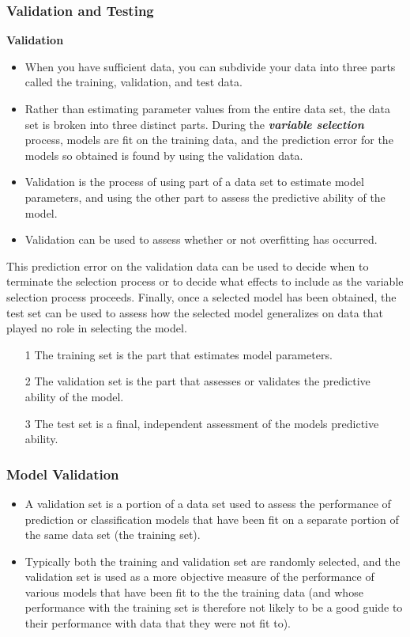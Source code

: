 \documentclass[PredictiveAnalytics101.tex]{subfiles}
\begin{document}
	\begin{frame}
		\frametitle{Validation and Testing}
		\textbf{Validation}
		\begin{itemize}
			\item When you have sufficient data, you can subdivide your data into three parts called the training, validation, and test data. \item Rather than estimating parameter values from the entire data set, the data set is broken into three distinct parts. During the \textbf{\textit{variable selection}} process, models are fit on the training data, and the prediction error for the models so obtained is found by using the validation data. \item Validation is the process of using part of a data set to estimate model parameters, and using the other part to assess the predictive ability of the model. 
			\item Validation can be used to assess whether or not overfitting has occurred.
		\end{itemize}
	\end{frame}
	\begin{frame}
		This prediction error on the validation data can be used to decide when to terminate the selection process or to decide what effects to include as the variable selection process proceeds. Finally, once a selected model has been obtained, the test set can be used to assess how the selected model generalizes on data that played no role in selecting the model.
		
		\begin{itemize}
			\item[1] The training set is the part that estimates model parameters.
			\item[2] The validation set is the part that assesses or validates the predictive ability of the model.
			\item[3] The test set is a final, independent assessment of the models predictive ability.
		\end{itemize}
	\end{frame}
	\begin{frame}
		\frametitle{Model Validation}
		\Large
		\begin{itemize}
			\item A validation set is a portion of a data set used to assess the performance of prediction or classification models that have been fit on a separate portion of the same data set (the training set). 
			\item Typically both the training and validation set are randomly selected, and the validation set is used as a more objective measure of the performance of various models that have been fit to the the training data (and whose performance with the training set is therefore not
			likely to be a good guide to their performance with data that they were not fit to).
		\end{itemize}
		
	\end{frame}
\end{document}
